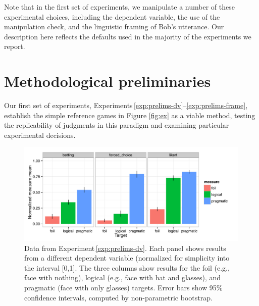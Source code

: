 \documentclass[man,noapacite]{apa2}
\newcounter{Experiment}
\newcommand{\exptref}[1]{Experiment\,\ref{#1}}
\newcommand{\exptrefrange}[2]{Experiments\,\ref{#1}--\ref{#2}}
\begin{document}
Note that in the first set of experiments, we manipulate a number of these experimental choices, including the dependent variable, the use of the manipulation check, and the linguistic framing of Bob's utterance. Our description here reflects the defaults used in the majority of the experiments we report.






\section{Methodological preliminaries}
\label{sec:prelims}

Our first set of experiments, \exptrefrange{exp:prelims-dv}{exp:prelims-frame}, establish the simple reference games in Figure \ref{fig:ex} as a viable method, testing the replicability of judgments in this paradigm and examining particular experimental decisions.

\begin{figure}[t]
  \centering
  \includegraphics[width=6in]{../plots/1-prelims-dv.pdf}
  \caption{\label{fig:prelims-dv} Data from \exptref{exp:prelims-dv}. Each panel shows results from a different dependent variable (normalized for simplicity into the interval [0,1]. The three columns show results for the foil (e.g., face with nothing), logical (e.g., face with hat and glasses), and pragmatic (face with only glasses) targets. Error bars show 95\% confidence intervals, computed by non-parametric bootstrap.}
\end{figure}
\end{document}
